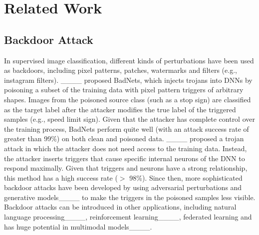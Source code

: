 \section{Related Work}
\label{sec:related}

\subsection{Backdoor Attack}
\label{sec:related-backdoor-attacks}
    In supervised image classification, different kinds of perturbations have been used as backdoors, including pixel patterns, patches, watermarks and filters (e.g., instagram filters).
    ____ proposed BadNets, which injects trojans into DNNs by poisoning a subset of the training data with pixel pattern triggers of arbitrary shapes. Images from the poisoned source class (such as a stop sign) are classified as the target label after the attacker modifies the true label of the triggered samples (e.g., speed limit sign). Given that the attacker has complete control over the training process, BadNets perform quite well (with an attack success rate of greater than 99\%) on both clean and poisoned data.
    ____ proposed a trojan attack in which the attacker does not need access to the training data. Instead, the attacker inserts triggers that cause  specific internal neurons of the DNN to respond maximally. Given that triggers and neurons have a strong relationship, this method has a high success rate ($>$ 98\%). 
    Since then, more sophisticated backdoor attacks have been developed by using adversarial perturbations and generative models____ to make the triggers in the poisoned samples less visible. Backdoor attacks can be introduced in other applications, including natural language processing____, reinforcement learning____, federated learning and has huge potential in multimodal models____.

